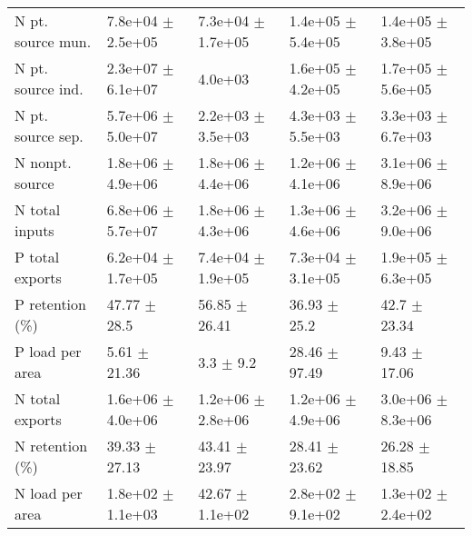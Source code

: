 \documentclass{article}
\begin{document}
\begin{landscape}
\begin{table}[!h]
\begin{tabular}{lllll}
N pt. source mun. & 7.8e+04 $\pm$ 2.5e+05 & 7.3e+04 $\pm$ 1.7e+05 & 1.4e+05 $\pm$ 5.4e+05 & 1.4e+05 $\pm$ 3.8e+05\\
N pt. source ind. & 2.3e+07 $\pm$ 6.1e+07 & 4.0e+03 & 1.6e+05 $\pm$ 4.2e+05 & 1.7e+05 $\pm$ 5.6e+05\\
N pt. source sep. & 5.7e+06 $\pm$ 5.0e+07 & 2.2e+03 $\pm$ 3.5e+03 & 4.3e+03 $\pm$ 5.5e+03 & 3.3e+03 $\pm$ 6.7e+03\\
\addlinespace
N nonpt. source & 1.8e+06 $\pm$ 4.9e+06 & 1.8e+06 $\pm$ 4.4e+06 & 1.2e+06 $\pm$ 4.1e+06 & 3.1e+06 $\pm$ 8.9e+06\\
N total inputs & 6.8e+06 $\pm$ 5.7e+07 & 1.8e+06 $\pm$ 4.3e+06 & 1.3e+06 $\pm$ 4.6e+06 & 3.2e+06 $\pm$ 9.0e+06\\
P total exports & 6.2e+04 $\pm$ 1.7e+05 & 7.4e+04 $\pm$ 1.9e+05 & 7.3e+04 $\pm$ 3.1e+05 & 1.9e+05 $\pm$ 6.3e+05\\
P retention (\%) & 47.77 $\pm$ 28.5 & 56.85 $\pm$ 26.41 & 36.93 $\pm$ 25.2 & 42.7 $\pm$ 23.34\\
P load per area & 5.61 $\pm$ 21.36 & 3.3 $\pm$ 9.2 & 28.46 $\pm$ 97.49 & 9.43 $\pm$ 17.06\\
\addlinespace
N total exports & 1.6e+06 $\pm$ 4.0e+06 & 1.2e+06 $\pm$ 2.8e+06 & 1.2e+06 $\pm$ 4.9e+06 & 3.0e+06 $\pm$ 8.3e+06\\
N retention (\%) & 39.33 $\pm$ 27.13 & 43.41 $\pm$ 23.97 & 28.41 $\pm$ 23.62 & 26.28 $\pm$ 18.85\\
N load per area & 1.8e+02 $\pm$ 1.1e+03 & 42.67 $\pm$ 1.1e+02 & 2.8e+02 $\pm$ 9.1e+02 & 1.3e+02 $\pm$ 2.4e+02\\
\bottomrule
\end{tabular}
\end{table}
\end{landscape}
\end{document}
